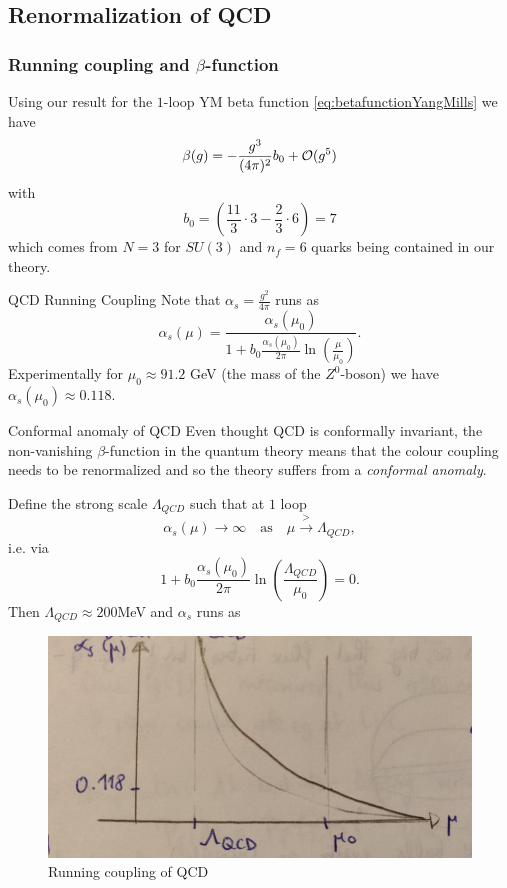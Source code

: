 \subsection{Renormalization of QCD}

\subsubsection{Running coupling and $\beta$-function}
Using our result for the $1$-loop YM beta function \ref{eq:betafunctionYangMills} we have
\begin{equation}
	\beta(g) = -\frac{g^3}{(4 \pi)^2} b_0+ \mathcal{O}(g^5)
\end{equation}
with
\begin{equation}
	b_0=\left(\frac{11}{3}\cdot 3 - \frac{2}{3} \cdot 6\right) = 7
\end{equation}
which comes from $N=3$ for $SU(3)$ and $n_f=6$ quarks being contained in our theory.\\
\begin{mybox}{QCD Running Coupling}
	Note that $\alpha_s =\frac{g^2}{4 \pi}$ runs as
	\begin{equation}
		\label{eq:qcdrunningcoupling}
		\alpha_s(\mu) = \frac{\alpha_s(\mu_0)}{1 + b_0 \frac{\alpha_s(\mu_0)}{2 \pi} \ln(\frac{\mu}{\mu_0})}.
	\end{equation}
	Experimentally for $\mu_0\approx 91.2$ GeV (the mass of the $Z^0$-boson) we have $\alpha_s(\mu_0)\approx 0.118$.\\
\end{mybox}
\begin{mybox}{Conformal anomaly of QCD}
		Even thought QCD is conformally invariant, the non-vanishing $\beta$-function in the quantum theory means that the colour coupling needs to be renormalized and so the theory suffers from a  \emph{conformal anomaly}.
\end{mybox}
Define the strong scale $\Lambda_{QCD}$ such that at $1$ loop
\begin{equation}
	\alpha_s(\mu) \rightarrow \infty \quad \text{as} \quad \mu \stackrel{>}{\rightarrow} \Lambda_{QCD},
\end{equation}
i.e. via
\begin{equation*}
	1+b_0 \frac{\alpha_s(\mu_0)}{2 \pi} \ln(\frac{\Lambda_{QCD}}{\mu_0}) =0.
\end{equation*}
Then $\Lambda_{QCD} \approx 200$MeV and $\alpha_s$ runs as 
\begin{figure}[h!]
	\centering
	\includegraphics[width=0.7\linewidth]{gfx/YMpictures/QCDrunningcoupling}
	\caption{Running coupling of QCD}
	\label{fig:qcdrunningcoupling}
\end{figure}
